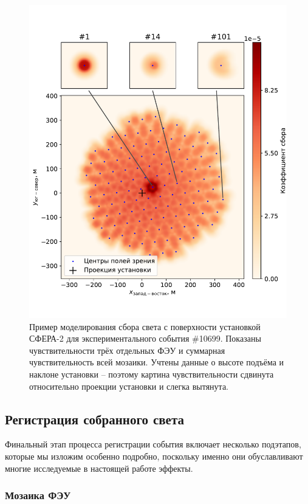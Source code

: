 \documentclass[12pt]{book}
\begin{document}
	\begin{figure}
		\centering
		\includegraphics[width=\columnwidth]{experimental-pmt-fov-example}
		\caption{Пример моделирования сбора света с поверхности установкой СФЕРА-2 для экспериментального события \#10699. Показаны чувствительности трёх отдельных ФЭУ и суммарная чувствительность всей мозаики. Учтены данные о высоте подъёма и наклоне установки -- поэтому картина чувствительности сдвинута относительно проекции установки и слегка вытянута.}
		\label{pic:experimental-pmt-fov-example}
	\end{figure}

	\subsection{Регистрация собранного света}

	Финальный этап процесса регистрации события включает несколько подэтапов, которые мы изложим особенно подробно, поскольку именно они обуславливают многие исследуемые в настоящей работе эффекты.

	\subsubsection{Мозаика ФЭУ}
	\label{sec:pmt-mosaic-details}
\end{document}
